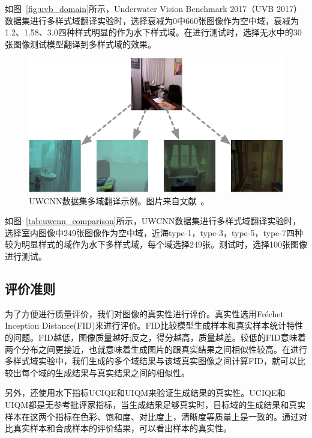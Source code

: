 如图~\ref{fig:uvb_domain}所示，Underwater Vision Benchmark 2017（UVB 2017）数据集进行多样式域翻译实验时，选择衰减为0中660张图像作为空中域，衰减为1.2、1.58、3.0四种样式明显的作为水下样式域。在进行测试时，选择无水中的30张图像测试模型翻译到多样式域的效果。

\begin{figure}[ht]
    \centering
  \includegraphics[width=\textwidth]{figures/UWCNN_dataset_domain.pdf}
  \caption{UWCNN数据集多域翻译示例。图片来自文献~\cite{li2020underwater}。}
  \label{fig:uwcnn_domain}
\end{figure}

如图~\ref{tab:uwcnn_comparison}所示，UWCNN数据集进行多样式域翻译实验时，选择室内图像中249张图像作为空中域，近海type-1，type-3，type-5，type-7四种较为明显样式的域作为水下多样式域，每个域选择249张。测试时，选择100张图像进行测试。

\subsection{评价准则}
为了方便进行质量评价，我们对图像的真实性进行评价。真实性选用Fréchet Inception Distance(FID)来进行评价。FID比较模型生成样本和真实样本统计特性的问题。FID越低，图像质量越好;反之，得分越高，质量越差。较低的FID意味着两个分布之间更接近，也就意味着生成图片的跟真实结果之间相似性较高。在进行多样式域实验中，我们生成的多个域结果与该域真实图像之间计算FID，就可以比较出每个域的生成结果与真实结果之间的相似性。

另外，还使用水下指标UCIQE和UIQM来验证生成结果的真实性。UCIQE和UIQM都是无参考批评家指标，当生成结果足够真实时，目标域的生成结果和真实样本在这两个指标在色彩、饱和度、对比度上，清晰度等质量上是一致的。通过对比真实样本和合成样本的评价结果，可以看出样本的真实性。


